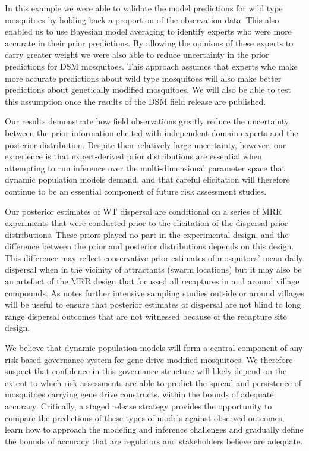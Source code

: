 \documentclass[]{bmcart}
\begin{document}
In this example we were able to validate the model predictions for wild type mosquitoes by holding back a proportion of the observation data. This also enabled us to use Bayesian model averaging to identify experts who were more accurate in their prior predictions. By allowing the opinions of these experts to carry greater weight we were also able to reduce uncertainty in the prior predictions for DSM mosquitoes. This approach assumes that experts who make more accurate predictions about wild type mosquitoes will also make better predictions about genetically modified mosquitoes. We will also be able to test this assumption once the results of the DSM field release are published.

Our results demonstrate how field observations greatly reduce the uncertainty between the prior information elicited with independent domain experts and the posterior distribution. Despite their relatively large uncertainty, however, our experience is that expert-derived prior distributions are essential when attempting to run inference over the multi-dimensional parameter space that dynamic population models demand, and that careful elicitation will therefore continue to be an essential component of future risk assessment studies.

Our posterior estimates of WT dispersal are conditional on a series of MRR experiments that were conducted prior to the elicitation of the dispersal prior distributions. These priors played no part in the experimental design, and the difference between the prior and posterior distributions depends on this design. This difference may reflect conservative prior estimates of mosquitoes' mean daily dispersal when in the vicinity of attractants (swarm locations) but it may also be an artefact of the MRR design that focussed all recaptures in and around village compounds. As \cite{Epopa2017} notes further intensive sampling studies outside or around villages will be useful to ensure that posterior estimates of dispersal are not blind to long range dispersal outcomes that are not witnessed because of the recapture site design.

We believe that dynamic population models will form a central component of any risk-based governance system for gene drive modified mosquitoes. We therefore suspect that confidence in this governance structure will likely depend on the extent to which risk assessments are able to predict the spread and persistence of mosquitoes carrying gene drive constructs, within the bounds of adequate accuracy. Critically, a staged release strategy provides the opportunity to compare the predictions of these types of models against observed outcomes, learn how to approach the modeling and inference challenges and gradually define the bounds of accuracy that are regulators and stakeholders believe are adequate.
\end{document}
